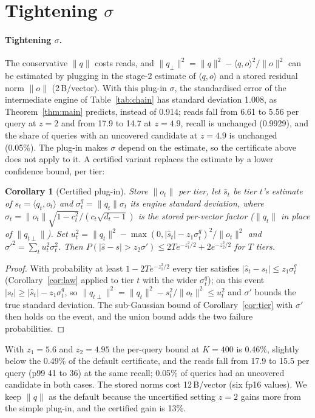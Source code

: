 \documentclass[10pt]{article}
\newtheorem{corollary}{Corollary}
\begin{document}
\section{Tightening $\sigma$}\label{sn:sigma}
\paragraph{Tightening $\sigma$.} The conservative $\|q\|$ costs reads, and $\|q_\perp\|^2=\|q\|^2-\langle q,o\rangle^2/\|o\|^2$ can be estimated by plugging in the stage-2 estimate of $\langle q,o\rangle$ and a stored residual norm $\|o\|$ (2\,B/vector). With this plug-in $\sigma$, the standardised error of the intermediate engine of Table~\ref{tab:chain} has standard deviation 1.008, as Theorem~\ref{thm:main} predicts, instead of 0.914; reads fall from 6.61 to 5.56 per query at $z=2$ and from 17.9 to 14.7 at $z=4.9$, recall is unchanged (0.9929), and the share of queries with an uncovered candidate at $z=4.9$ is unchanged (0.05\%). The plug-in makes $\sigma$ depend on the estimate, so the certificate above does not apply to it. A certified variant replaces the estimate by a lower confidence bound, per tier:
\begin{corollary}[Certified plug-in]\label{cor:lcb}
Store $\|o_t\|$ per tier, let $\hat s_t$ be tier $t$'s estimate of $s_t=\langle q_t,o_t\rangle$ and $\sigma_t^{q}=\|q_t\|\sigma_t$ its engine standard deviation, where $\sigma_t=\|o_t\|\sqrt{1-c_t^2}/(c_t\sqrt{d_t-1})$ is the stored per-vector factor ($\|q_t\|$ in place of $\|q_{t\perp}\|$). Set $u_t^2=\|q_t\|^2-\max(0,|\hat s_t|-z_1\sigma_t^{q})^2/\|o_t\|^2$ and $\sigma'^2=\sum_t u_t^2\sigma_t^2$. Then $P(|\hat s-s|>z_2\sigma')\le 2T e^{-z_1^2/2}+2e^{-z_2^2/2}$ for $T$ tiers.
\end{corollary}
\begin{proof}
With probability at least $1-2Te^{-z_1^2/2}$ every tier satisfies $|\hat s_t-s_t|\le z_1\sigma_t^{q}$ (Corollary~\ref{cor:law} applied to tier $t$ with the wider $\sigma_t^q$); on this event $|s_t|\ge|\hat s_t|-z_1\sigma_t^q$, so $\|q_{t\perp}\|^2=\|q_t\|^2-s_t^2/\|o_t\|^2\le u_t^2$ and $\sigma'$ bounds the true standard deviation. The sub-Gaussian bound of Corollary~\ref{cor:tier} with $\sigma'$ then holds on the event, and the union bound adds the two failure probabilities.
\end{proof}
With $z_1=5.6$ and $z_2=4.95$ the per-query bound at $K=400$ is 0.46\%, slightly below the 0.49\% of the default certificate, and the reads fall from 17.9 to 15.5 per query (p99 41 to 36) at the same recall; 0.05\% of queries had an uncovered candidate in both cases. The stored norms cost 12\,B/vector (six fp16 values). We keep $\|q\|$ as the default because the uncertified setting $z=2$ gains more from the simple plug-in, and the certified gain is 13\%.
\end{document}
